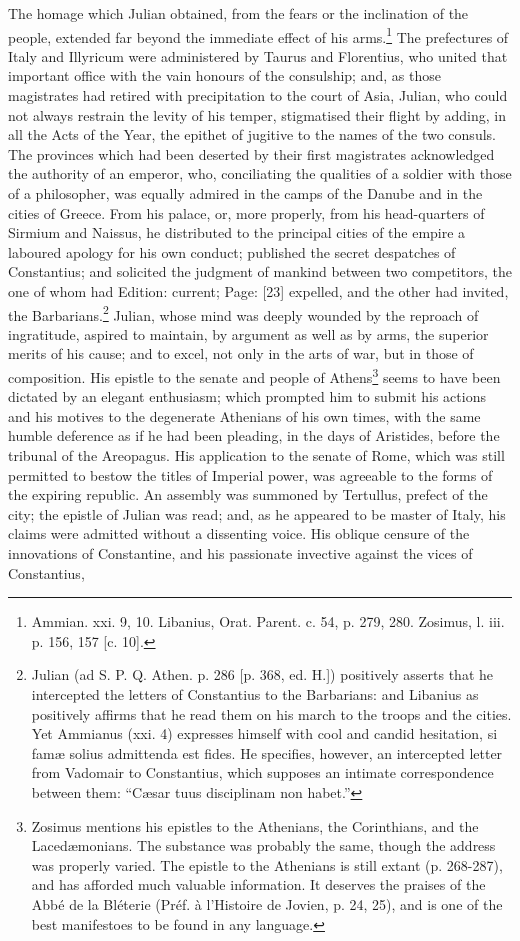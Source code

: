 The homage which Julian obtained, from the fears or the inclination of the people, extended far beyond the immediate effect of his arms.\footnote{Ammian. xxi. 9, 10. Libanius, Orat. Parent. c. 54, p. 279, 280. Zosimus, l. iii. p. 156, 157 [c. 10].} The prefectures of Italy and Illyricum were administered by Taurus and Florentius, who united that important office with the vain honours of the consulship; and, as those magistrates had retired with precipitation to the court of Asia, Julian, who could not always restrain the levity of his temper, stigmatised their flight by adding, in all the Acts of the Year, the epithet of jugitive to the names of the two consuls. The provinces which had been deserted by their first magistrates acknowledged the authority of an emperor, who, conciliating the qualities of a soldier with those of a philosopher, was equally admired in the camps of the Danube and in the cities of Greece. From his palace, or, more properly, from his head-quarters of Sirmium and Naissus, he distributed to the principal cities of the empire a laboured apology for his own conduct; published the secret despatches of Constantius; and solicited the judgment of mankind between two competitors, the one of whom had Edition: current; Page: [23] expelled, and the other had invited, the Barbarians.\footnote{Julian (ad S. P. Q. Athen. p. 286 [p. 368, ed. H.]) positively asserts that he intercepted the letters of Constantius to the Barbarians: and Libanius as positively affirms that he read them on his march to the troops and the cities. Yet Ammianus (xxi. 4) expresses himself with cool and candid hesitation, si famæ solius admittenda est fides. He specifies, however, an intercepted letter from Vadomair to Constantius, which supposes an intimate correspondence between them: \texthebrew{“}Cæsar tuus disciplinam non habet.\texthebrew{}”} Julian, whose mind was deeply wounded by the reproach of ingratitude, aspired to maintain, by argument as well as by arms, the superior merits of his cause; and to excel, not only in the arts of war, but in those of composition. His epistle to the senate and people of Athens\footnote{Zosimus mentions his epistles to the Athenians, the Corinthians, and the Lacedæmonians. The substance was probably the same, though the address was properly varied. The epistle to the Athenians is still extant (p. 268-287), and has afforded much valuable information. It deserves the praises of the Abbé de la Bléterie (Préf. à l\texthebrew{}’Histoire de Jovien, p. 24, 25), and is one of the best manifestoes to be found in any language.} seems to have been dictated by an elegant enthusiasm; which prompted him to submit his actions and his motives to the degenerate Athenians of his own times, with the same humble deference as if he had been pleading, in the days of Aristides, before the tribunal of the Areopagus. His application to the senate of Rome, which was still permitted to bestow the titles of Imperial power, was agreeable to the forms of the expiring republic. An assembly was summoned by Tertullus, prefect of the city; the epistle of Julian was read; and, as he appeared to be master of Italy, his claims were admitted without a dissenting voice. His oblique censure of the innovations of Constantine, and his passionate invective against the vices of Constantius, 